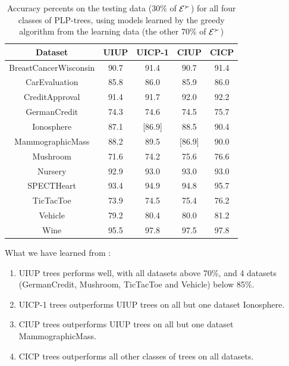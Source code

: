\begin{table}
  \centering
  \small
  \begin{tabular}{ |c||c|c|c|c| }
    \hline
    Dataset          				& UIUP & UICP-1 & CIUP & CICP \\
    \hline \hline
    BreastCancerWisconsin   & 90.7 & 91.4 & 90.7 & 91.4 \\
    \hline                                            
    CarEvaluation           & 85.8 & 86.0 & 85.9 & 86.0 \\
    \hline                                            
    CreditApproval          & 91.4 & 91.7 & 92.0 & 92.2 \\
    \hline                                            
    GermanCredit            & 74.3 & 74.6 & 74.5 & 75.7 \\
    \hline                                            
    Ionosphere              & 87.1 & [86.9] & 88.5 & 90.4 \\
    \hline                                            
    MammographicMass        & 88.2 & 89.5 & [86.9] & 90.0 \\
    \hline                                            
    Mushroom                & 71.6 & 74.2 & 75.6 & 76.6 \\
    \hline                                            
    Nursery                 & 92.9 & 93.0 & 93.0 & 93.0 \\
    \hline                                            
    SPECTHeart              & 93.4 & 94.9 & 94.8 & 95.7 \\
    \hline                                            
    TicTacToe               & 73.9 & 74.5 & 75.4 & 76.2 \\
    \hline                                            
    Vehicle                 & 79.2 & 80.4 & 80.0 & 81.2 \\
    \hline                                            
    Wine                    & 95.5 & 97.8 & 97.5 & 97.8 \\
    \hline
  \end{tabular}
  \caption{Accuracy percents on the testing data (30\% of $\mathcal{E}^\succ$)
					 for all four classes of PLP-trees, using models learned
					 by the greedy algorithm from the learning 
					 data (the other 70\% of $\mathcal{E}^\succ$)}
  \label{tbl:trees2}
\end{table}

What we have learned from :
\begin{enumerate}
	\item UIUP trees performs well, with all datasets above 70\%, and
				4 datasets (GermanCredit,
				Mushroom, TicTacToe and Vehicle) below 85\%.
	\item UICP-1 trees outperforms UIUP trees on all but one dataset
				Ionosphere.
	\item CIUP trees outperforms UIUP trees on all but one dataset
				MammographicMass.
	\item CICP trees outperforms all other classes of trees on all
				datasets.
\end{enumerate}


